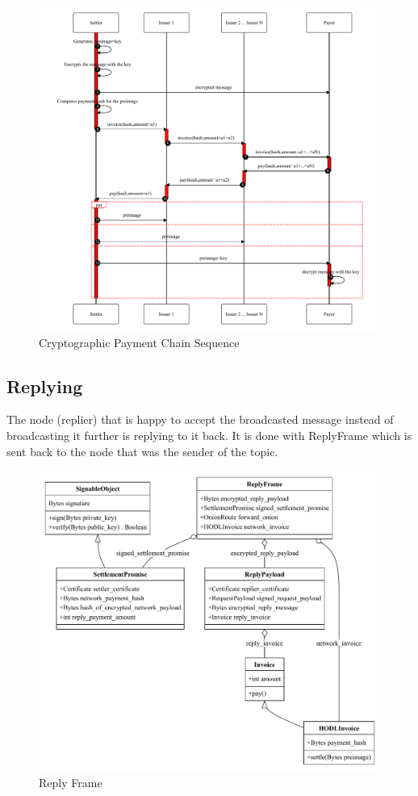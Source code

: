 \documentclass{article}
\begin{document}
\begin{figure}
	\centering
	\includegraphics[scale=0.7]{PaymentChain.pdf}
	\caption{Cryptographic Payment Chain Sequence}
	\label{fig:cryptopaychain}
\end{figure}


\subsection{Replying}
The node (replier) that is happy to accept the broadcasted message instead of broadcasting it further is replying to it back. It is done with ReplyFrame which is sent back to the node that was the sender of the topic.

\begin{figure}
	\centering
	\includegraphics[scale=0.7]{ReplyFrame.pdf}
	\caption{Reply Frame}
	\label{fig:fr:replyframe}
\end{figure}
\end{document}

